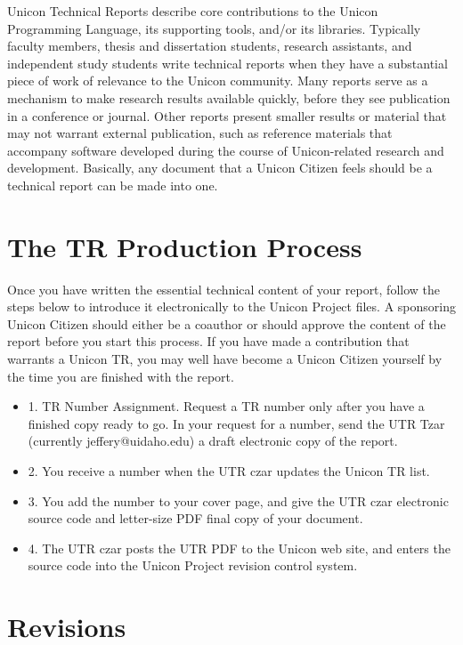 \documentclass[letterpaper,12pt]{article}
\begin{document}
Unicon Technical Reports describe core contributions to the
Unicon Programming Language, its supporting tools, and/or its libraries.
Typically faculty members, thesis and dissertation students, research
assistants, and independent study students write technical reports
when they have a substantial piece of work of relevance to the Unicon
community.  Many reports serve as a mechanism to make research results
available quickly, before they see publication in a conference or
journal. Other reports present smaller results or material that may
not warrant external publication, such as reference materials that
accompany software developed during the course of Unicon-related
research and development. Basically, any document that a Unicon
Citizen feels should be a technical report can be made into one.

\section{The TR Production Process}

Once you have written the essential technical content of your report,
follow the steps below to introduce it electronically to the Unicon
Project files. A sponsoring Unicon Citizen should either be a coauthor
or should approve the content of the report before you start this
process. If you have made a contribution that warrants a Unicon TR,
you may well have become a Unicon Citizen yourself by the time you
are finished with the report.

\begin{itemize}
\item 1. TR Number Assignment.
Request a TR number only after you have a finished copy ready to
go. In your request for a number, send the UTR Tzar (currently
jeffery@uidaho.edu) a draft electronic copy of the report.
\item 2. You receive a number when the UTR czar updates the Unicon TR list.
\item 3. You add the number to your cover page, and give the UTR czar
electronic source code and letter-size PDF final copy of your document.
\item 4. The UTR czar posts the UTR PDF to the Unicon web site, and
enters the source code into the Unicon Project revision control system.
\end{itemize}

\section{Revisions}
\end{document}
